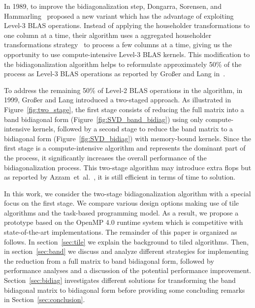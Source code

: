 In 1989, to improve the bidiagonalization step,
Dongarra, Sorensen, and Hammarling~\cite{dongarra1989block}
proposed a new variant which has the advantage of exploiting
Level-3 BLAS operations.
Instead of applying the householder transformations to
one column at a time,
their algorithm uses a aggregated householder transformations
strategy~\cite{bischof1987wy} to process a few columns at a time,
giving us the opportunity to use compute-intensive Level-3 BLAS kernels.
This modification to the bidiagonalization algorithm helps
to reformulate approximately 50\% of the process as Level-3 BLAS operations
as reported by Gro{\ss}er and Lang in~\cite{grosser1999efficient}.

To address the remaining 50\% of Level-2 BLAS operations in the
algorithm, in 1999, Gro{\ss}er and Lang introduced a two-staged
approach.
As illustrated in Figure~\ref{fig:two_stage},
the first stage consists of reducing the full matrix into a
band bidiagonal form (Figure~\ref{fig:SVD_band_bidiag}) using only
compute-intensive kernels,
followed by a second stage to reduce the band
matrix to a bidiagonal form (Figure~\ref{fig:SVD_bidiag}) with
memory-bound kernels.
Since the first stage is a compute-intensive
algorithm and represents the dominant part of the process,
it significantly increases the overall performance of the
bidiagonalization process.
This two-stage algorithm may introduce extra flops
but as reported by Azzam~et~al\@.~\cite{haidar2013improved},
it is still efficient in terms of time to solution.

In this work, we consider the two-stage bidiagonalization algorithm
with a special focus on the first stage.
We compare various design options making use of tile algorithms and
the task-based programming model.
As a result,
we propose a prototype based on the OpenMP 4.0 runtime system which is
competitive with state-of-the-art implementations.
The remainder of this paper is organized as follows.
In section~\ref{sec:tile} we explain the background to tiled algorithms.
Then, in section~\ref{sec:band} we discuss and analyze
different strategies for implementing the
reduction from a full matrix to band bidiagonal form,
followed by performance analyses and a discussion of
the potential performance improvement.
Section~\ref{sec:bidiag} investigates different solutions
for transforming the band bidiagonal matrix
to bidiagonal form before providing some concluding
remarks in Section~\ref{sec:conclusion}.

